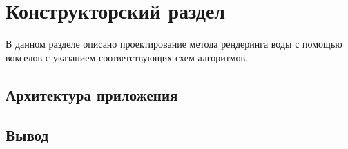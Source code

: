 \chapter{Конструкторский раздел}
\label{cha:design}

В данном разделе описано проектирование метода рендеринга воды с помощью вокселов
с указанием соответствующих схем алгоритмов.

\section{Архитектура приложения}

\section{Вывод}



